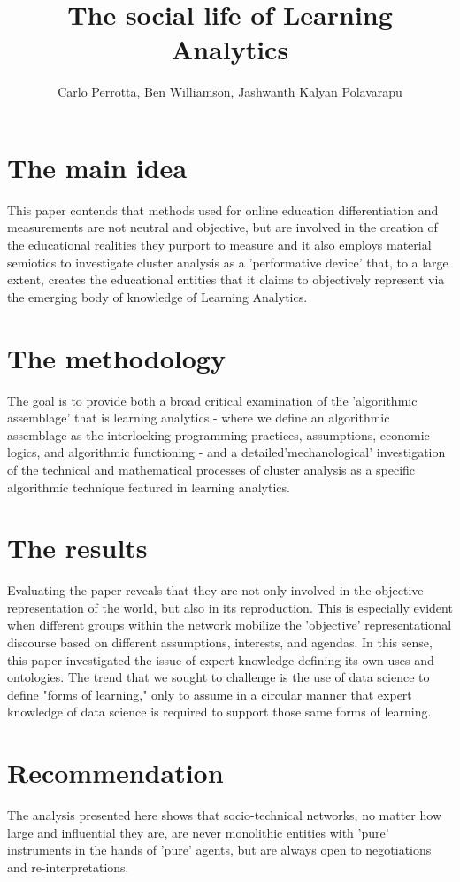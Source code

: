 \documentclass[a4paper]{article}
\title{The social life of Learning Analytics}
\author[1]{Carlo Perrotta, Ben Williamson, Jashwanth Kalyan Polavarapu}
\begin{document}
\maketitle
\section{The main idea}

This paper contends that methods used for online education differentiation and measurements are not neutral and objective, but are involved in the creation of the educational realities they purport to measure and it also employs material semiotics to investigate cluster analysis as a 'performative device' that, to a large extent, creates the educational entities that it claims to objectively represent via the emerging body of knowledge of Learning Analytics.

\section{The methodology }

The goal is to provide both a broad critical examination of the 'algorithmic assemblage' that is learning analytics - where we define an algorithmic assemblage as the interlocking programming practices, assumptions, economic logics, and algorithmic functioning - and a detailed'mechanological' investigation of the technical and mathematical processes of cluster analysis as a specific algorithmic technique featured in learning analytics.

\section{The results}
 
Evaluating the paper reveals that they are not only involved in the objective representation of the world, but also in its reproduction. This is especially evident when different groups within the network mobilize the 'objective' representational discourse based on different assumptions, interests, and agendas. In this sense, this paper investigated the issue of expert knowledge defining its own uses and ontologies. The trend that we sought to challenge is the use of data science to define "forms of learning," only to assume in a circular manner that expert knowledge of data science is required to support those same forms of learning.

\section{Recommendation}

The analysis presented here shows that socio-technical networks, no matter how large and influential they are, are never monolithic entities with 'pure' instruments in the hands of 'pure' agents, but are always open to negotiations and re-interpretations.
\end{document}
